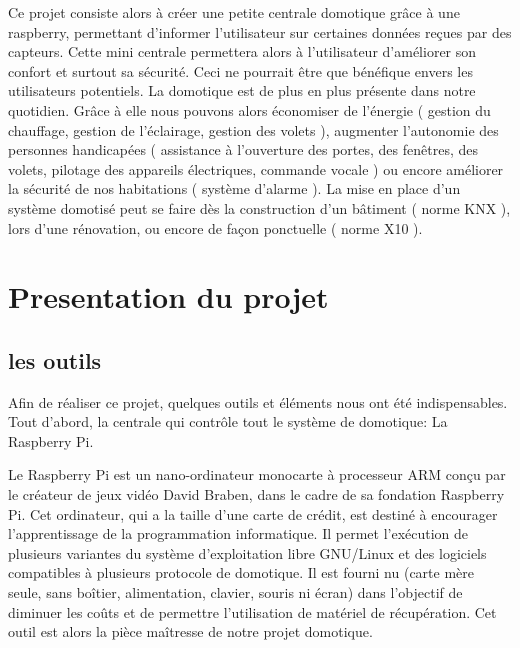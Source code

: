 Ce projet consiste alors à créer une petite centrale domotique grâce à une raspberry, permettant d'informer l'utilisateur sur certaines données reçues par des capteurs. Cette mini centrale permettera alors à l'utilisateur d'améliorer son confort et surtout sa sécurité. Ceci ne pourrait être que bénéfique envers les utilisateurs potentiels. La domotique est de plus en plus présente dans notre quotidien. Grâce à elle nous pouvons alors économiser de l'énergie ( gestion du chauffage, gestion de l'éclairage, gestion des volets ), augmenter l'autonomie des personnes handicapées ( assistance à l'ouverture des portes, des fenêtres, des volets, pilotage des appareils électriques, commande vocale ) ou encore améliorer la sécurité de nos habitations ( système d'alarme ). La mise en place d'un système domotisé peut se faire dès la construction d'un bâtiment ( norme KNX ), lors d'une rénovation, ou encore de façon ponctuelle ( norme X10 ).





\newpage
\chapter{Presentation du projet}
\section{les outils} 
Afin de réaliser ce projet, quelques outils et éléments nous ont été indispensables. Tout d'abord, la centrale qui contrôle tout le système de domotique: La Raspberry Pi.

Le Raspberry Pi est un nano-ordinateur monocarte à processeur ARM conçu par le créateur de jeux vidéo David Braben, dans le cadre de sa fondation Raspberry Pi. Cet ordinateur, qui a la taille d'une carte de crédit, est destiné à encourager l'apprentissage de la programmation informatique. Il permet l'exécution de plusieurs variantes du système d'exploitation libre GNU/Linux et des logiciels compatibles à plusieurs protocole de domotique. Il est fourni nu (carte mère seule, sans boîtier, alimentation, clavier, souris ni écran) dans l'objectif de diminuer les coûts et de permettre l'utilisation de matériel de récupération.
Cet outil est alors la pièce maîtresse de notre projet domotique. 
